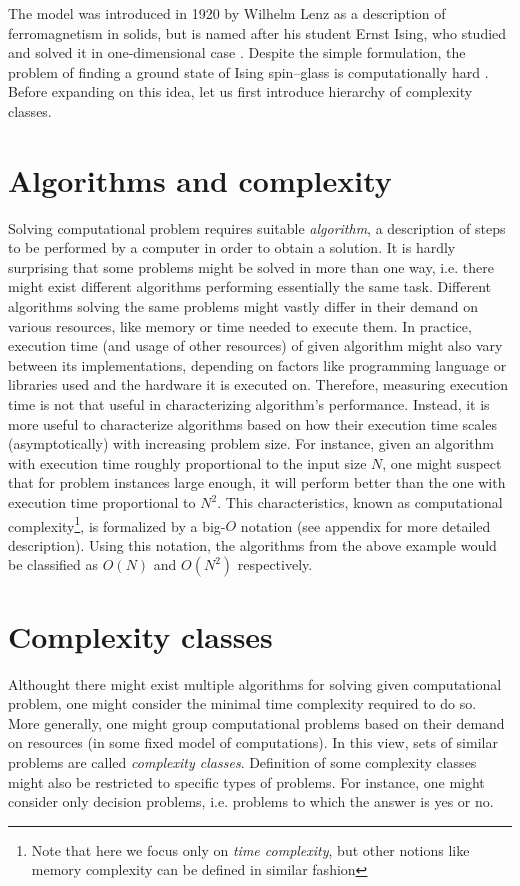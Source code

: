 The model was introduced in 1920 by Wilhelm Lenz \cite{lenz} as a description of ferromagnetism in solids, but is named after his student Ernst Ising, who studied and solved it in one-dimensional case \cite{ising}.  Despite the simple formulation, the problem of finding a ground state of Ising spin--glass is computationally hard \cite{barahoma}. Before expanding on this idea, let us first introduce hierarchy of complexity classes.

\section{Algorithms and complexity}
Solving computational problem requires suitable \emph{algorithm}, a description of steps to be performed by a computer in order to obtain a solution. It is hardly surprising that some problems might be solved in more than one way, i.e. there might exist different algorithms performing essentially the same task. Different algorithms solving the same problems might vastly differ in their demand on various resources, like memory or time needed to execute them. In practice, execution time (and usage of other resources) of given algorithm might also vary between its implementations, depending on factors like programming language or libraries used and the hardware it is executed on. Therefore, measuring execution time is not that useful in characterizing algorithm's performance.  Instead, it is more useful to characterize algorithms based on how their execution time scales (asymptotically) with increasing problem size. For instance, given an algorithm with execution time roughly proportional to the input size $N$, one might suspect that for problem instances large enough, it will perform better than the one with execution time proportional to $N^{2}$. This characteristics, known as computational complexity\footnote{Note that here we focus only on \emph{time complexity}, but other notions like memory complexity can be defined in similar fashion}, is formalized by a big-$O$ notation (see appendix for more detailed description). Using this notation, the algorithms from the above example would be classified as $O(N)$ and $O(N^{2})$ respectively.

\section{Complexity classes}
Althought there might exist multiple algorithms for solving given computational problem, one might consider the minimal time complexity required to do so. More generally, one might group computational problems based on their demand on resources (in some fixed model of computations). In this view, sets of similar problems are called \emph{complexity classes}. Definition of some complexity classes might also be restricted to specific types of problems. For instance, one might consider only decision problems, i.e. problems to which the answer is yes or no.

